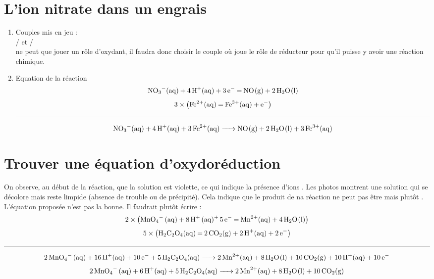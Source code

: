 \documentclass[a4paper,12pt,fleqn]{article}%
\begin{document}
\section{L'ion nitrate dans un engrais}
\begin{enumerate}
    \item Couples mis en jeu : \\
    / et /\\
     ne peut que jouer un rôle d'oxydant, il faudra donc choisir le couple où  joue le rôle de réducteur pour qu'il puisse y avoir une réaction chimique.
    \item Equation de la réaction $$\ce{NO3-(aq) + 4H+(aq) + 3e- = NO(g) + 2H2O(l)}$$
    $$ 3\times \left(\ce{Fe^2+(aq) = Fe^3+(aq) + e-}\right)$$
    \begin{center}
        \rule{0.5\textwidth}{.4pt}
    \end{center}
    $$ \ce{NO3-(aq) + 4H+(aq) + 3Fe^2+(aq) -> NO(g) + 2H2O(l) + 3Fe^3+(aq)}$$
\end{enumerate}

\section{Trouver une équation d'oxydoréduction}
On observe, au début de la réaction, que la solution est violette, ce qui indique la présence d'ions . Les photos montrent une solution qui se décolore mais reste limpide (absence de trouble ou de précipité). Cela indique que le produit de na réaction ne peut pas être  mais plutôt . L'équation proposée n'est pas la bonne. Il faudrait plutôt écrire :
$$2\times \left(\ce{MnO4- (aq) + 8H+ (aq)+ 5e- = Mn^2+(aq) + 4H2O(l)}\right)$$
$$5\times \left(\ce{H2C2O4(aq) = 2CO2(g) + 2 H+(aq) + 2 e-}\right) $$
\begin{center}
    \rule{0.5\textwidth}{.4pt}
\end{center}
$$ \ce{2MnO4- (aq) + 16H+(aq) + 10e- + 5H2C2O4(aq) -> 2Mn^2+(aq) + 8H2O(l) + 10CO2(g) + 10H+(aq) + 10e-}$$
$$ \ce{2MnO4- (aq) + 6H+(aq) + 5H2C2O4(aq) -> 2Mn^2+(aq) + 8H2O(l) + 10CO2(g)}$$
\end{document}
